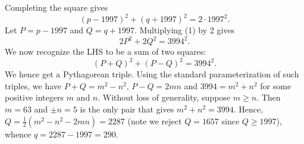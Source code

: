 Completing the square gives \[(p-1997)^2 + (q+1997)^2 = 2 \cdot 1997^2. \tag{1}\] Let $P = p - 1997$ and $Q = q + 1997$. Multiplying (1) by 2 gives \[2P^2 + 2Q^2 = 3994^2.\] We now recognize the LHS to be a sum of two squares: \[(P+Q)^2 + (P-Q)^2 = 3994^2.\] We hence get a Pythagorean triple. Using the standard parameterization of such triples, we have $P+Q = m^2 - n^2$, $P-Q = 2mn$ and $3994 = m^2 + n^2$ for some positive integers $m$ and $n$. Without loss of generality, suppose $m \geq n$. Then $m = 63$ and $\pm n = 5$ is the only pair that gives $m^2 + n^2 = 3994$. Hence, $Q = \frac12 (m^2 - n^2 - 2mn) = 2287$ (note we reject $Q = 1657$ since $Q \geq 1997$), whence $q = 2287 - 1997 = 290$.